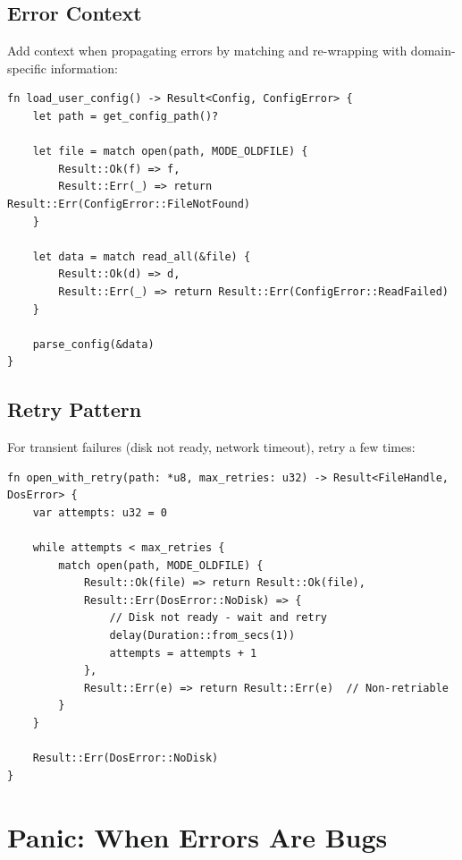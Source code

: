 \subsection{Error Context}

Add context when propagating errors by matching and re-wrapping with domain-specific information:

\begin{lstlisting}
fn load_user_config() -> Result<Config, ConfigError> {
    let path = get_config_path()?

    let file = match open(path, MODE_OLDFILE) {
        Result::Ok(f) => f,
        Result::Err(_) => return Result::Err(ConfigError::FileNotFound)
    }

    let data = match read_all(&file) {
        Result::Ok(d) => d,
        Result::Err(_) => return Result::Err(ConfigError::ReadFailed)
    }

    parse_config(&data)
}
\end{lstlisting}

\subsection{Retry Pattern}

For transient failures (disk not ready, network timeout), retry a few times:

\begin{lstlisting}
fn open_with_retry(path: *u8, max_retries: u32) -> Result<FileHandle, DosError> {
    var attempts: u32 = 0

    while attempts < max_retries {
        match open(path, MODE_OLDFILE) {
            Result::Ok(file) => return Result::Ok(file),
            Result::Err(DosError::NoDisk) => {
                // Disk not ready - wait and retry
                delay(Duration::from_secs(1))
                attempts = attempts + 1
            },
            Result::Err(e) => return Result::Err(e)  // Non-retriable
        }
    }

    Result::Err(DosError::NoDisk)
}
\end{lstlisting}

\section{Panic: When Errors Are Bugs}
\label{sec:panic}

